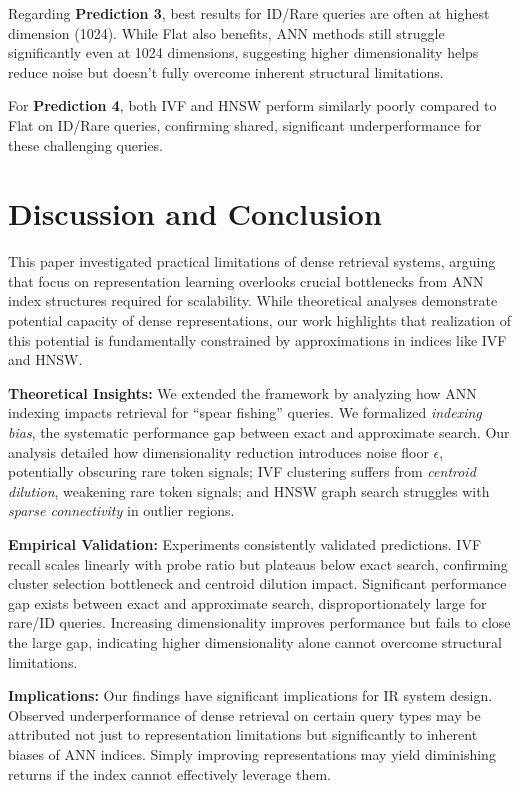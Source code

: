 \documentclass[conference,anonymous]{IEEEtran}
\begin{document}
Regarding \textbf{Prediction 3}, best results for ID/Rare queries are often at highest dimension (1024). While Flat also benefits, ANN methods still struggle significantly even at 1024 dimensions, suggesting higher dimensionality helps reduce noise but doesn't fully overcome inherent structural limitations.

For \textbf{Prediction 4}, both IVF and HNSW perform similarly poorly compared to Flat on ID/Rare queries, confirming shared, significant underperformance for these challenging queries.

\section{Discussion and Conclusion}

This paper investigated practical limitations of dense retrieval systems, arguing that focus on representation learning overlooks crucial bottlenecks from ANN index structures required for scalability. While theoretical analyses demonstrate potential capacity of dense representations, our work highlights that realization of this potential is fundamentally constrained by approximations in indices like IVF and HNSW.

\textbf{Theoretical Insights:} We extended the framework by analyzing how ANN indexing impacts retrieval for ``spear fishing'' queries. We formalized \textit{indexing bias}, the systematic performance gap between exact and approximate search. Our analysis detailed how dimensionality reduction introduces noise floor $\epsilon$, potentially obscuring rare token signals; IVF clustering suffers from \textit{centroid dilution}, weakening rare token signals; and HNSW graph search struggles with \textit{sparse connectivity} in outlier regions.

\textbf{Empirical Validation:} Experiments consistently validated predictions. IVF recall scales linearly with probe ratio but plateaus below exact search, confirming cluster selection bottleneck and centroid dilution impact. Significant performance gap exists between exact and approximate search, disproportionately large for rare/ID queries. Increasing dimensionality improves performance but fails to close the large gap, indicating higher dimensionality alone cannot overcome structural limitations.

\textbf{Implications:} Our findings have significant implications for IR system design. Observed underperformance of dense retrieval on certain query types may be attributed not just to representation limitations but significantly to inherent biases of ANN indices. Simply improving representations may yield diminishing returns if the index cannot effectively leverage them.
\end{document}
